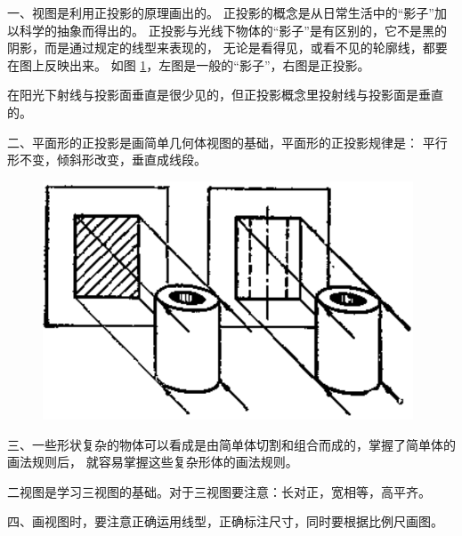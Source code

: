 \xiaojie

一、视图是利用正投影的原理画出的。
正投影的概念是从日常生活中的“影子”加以科学的抽象而得出的。
正投影与光线下物体的“影子”是有区别的，它不是黑的阴影，而是通过规定的线型来表现的，
无论是看得见，或看不见的轮廓线，都要在图上反映出来。
如图 \ref{fig:czjh2-8-22}，左图是一般的“影子”，右图是正投影。

在阳光下射线与投影面垂直是很少见的，但正投影概念里投射线与投影面是垂直的。


二、平面形的正投影是画简单几何体视图的基础，平面形的正投影规律是：
平行形不变，倾斜形改变，垂直成线段。

\begin{figure}[htbp]
    \centering
    \includegraphics[width=11cm]{../pic/czjh2-ch8-22.png}
    \caption{}\label{fig:czjh2-8-22}
\end{figure}


三、一些形状复杂的物体可以看成是由简单体切割和组合而成的，掌握了简单体的画法规则后，
就容易掌握这些复杂形体的画法规则。

二视图是学习三视图的基础。对于三视图要注意：长对正，宽相等，高平齐。


四、画视图时，要注意正确运用线型，正确标注尺寸，同时要根据比例尺画图。

